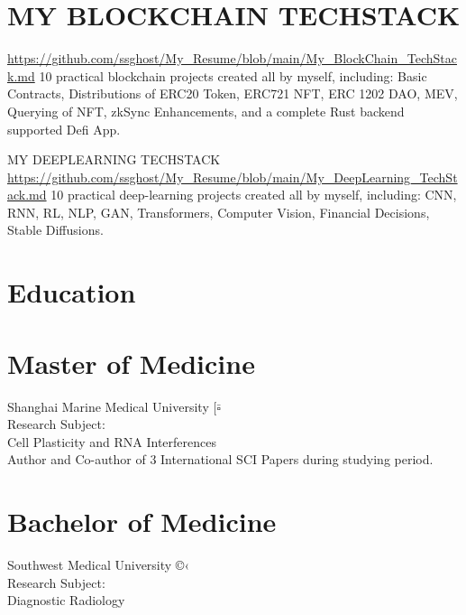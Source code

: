 \documentclass[10pt]{article}
\begin{document}
\section*{MY BLOCKCHAIN TECHSTACK}
\href{https://github.com/ssghost/My_Resume/blob/main/My_BlockChain_TechStack.md}{https://github.com/ssghost/My\_Resume/blob/main/My\_BlockChain\_TechStack.md} 10 practical blockchain projects created all by myself, including: Basic Contracts, Distributions of ERC20 Token, ERC721 NFT, ERC 1202 DAO, MEV, Querying of NFT, zkSync Enhancements, and a complete Rust backend supported Defi App.

MY DEEPLEARNING TECHSTACK\\
\href{https://github.com/ssghost/My_Resume/blob/main/My_DeepLearning_TechStack.md}{https://github.com/ssghost/My\_Resume/blob/main/My\_DeepLearning\_TechStack.md} 10 practical deep-learning projects created all by myself, including: CNN, RNN, RL, NLP, GAN, Transformers, Computer Vision, Financial Decisions, Stable Diffusions.

\section*{Education}
\section*{Master of Medicine}
Shanghai Marine Medical University $[\bar{\square}$\\
Research Subject:\\
Cell Plasticity and RNA Interferences\\
Author and Co-author of 3 International SCI Papers during studying period.

\section*{Bachelor of Medicine}
Southwest Medical University ©‹\\
Research Subject:\\
Diagnostic Radiology
\end{document}
